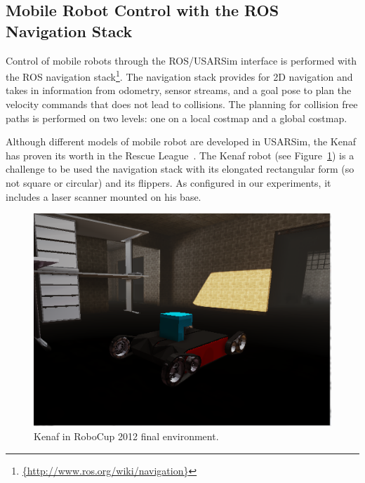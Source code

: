 \subsection*{Mobile Robot Control with the ROS Navigation Stack}
Control of mobile robots through the ROS/USARSim interface is performed with the ROS navigation stack\footnote{\url{{http://www.ros.org/wiki/navigation}}}. 
The navigation stack provides for 2D navigation and takes in information from odometry, sensor streams, and a goal pose to plan the velocity commands that does not lead to collisions. 
The planning for collision free paths is performed on two levels: one on a local costmap and a global costmap.

Although different models of mobile robot are developed in USARSim, the Kenaf has proven its worth in the Rescue League~\cite{okamoto2008validation}.
The Kenaf robot (see Figure~\ref{fig:kenaf}) is a challenge to be used the navigation stack with its elongated rectangular form (so not square or circular) and its flippers. 
As configured in our experiments, it includes a laser scanner mounted on his base. 

\begin{figure}[t!]
\centering
\includegraphics[width=0.45\columnwidth]{Figures/Robots/RoboCup2012finalWithHokuyo.png}
\caption{Kenaf in RoboCup 2012 final environment.}\label{fig:kenaf}
\end{figure}




